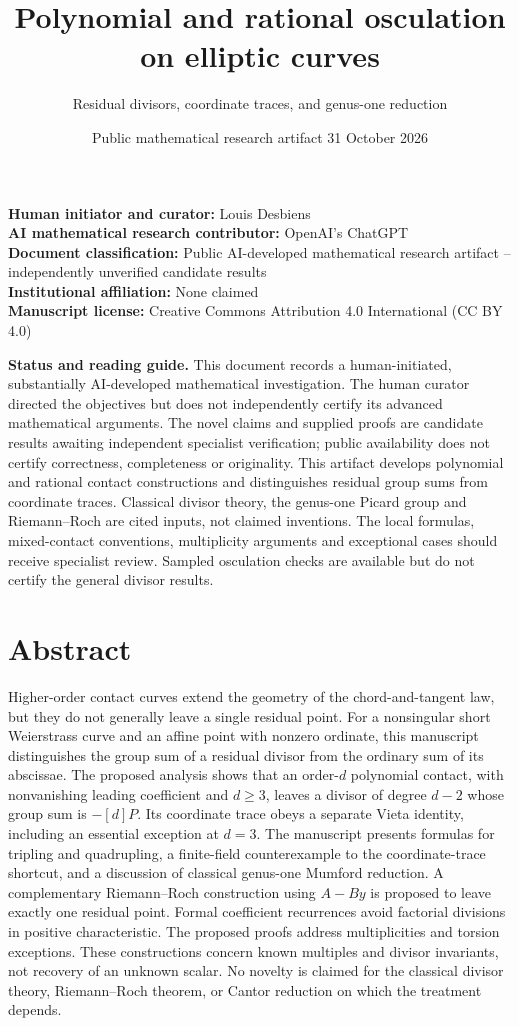 \documentclass[
  11pt,
  a4paper,
]{article}
\title{Polynomial and rational osculation on elliptic curves}
\subtitle{Residual divisors, coordinate traces, and genus-one reduction}
\author{}
\date{Public mathematical research artifact \textbar{} 31 October 2026}
\begin{document}
\maketitle

\textbf{Human initiator and curator:} Louis Desbiens\\
\textbf{AI mathematical research contributor:} OpenAI's ChatGPT\\
\textbf{Document classification:} Public AI-developed mathematical
research artifact -- independently unverified candidate results\\
\textbf{Institutional affiliation:} None claimed\\
\textbf{Manuscript license:} Creative Commons Attribution 4.0 International (CC BY 4.0)

\textbf{Status and reading guide.} This document records a
human-initiated, substantially AI-developed mathematical investigation.
The human curator directed the objectives but does not independently
certify its advanced mathematical arguments. The novel claims and
supplied proofs are candidate results awaiting independent specialist
verification; public availability does not certify correctness,
completeness or originality. This artifact develops polynomial and
rational contact constructions and distinguishes residual group sums
from coordinate traces. Classical divisor theory, the genus-one Picard
group and Riemann--Roch are cited inputs, not claimed inventions. The
local formulas, mixed-contact conventions, multiplicity arguments and
exceptional cases should receive specialist review. Sampled osculation
checks are available but do not certify the general divisor results.

\section{Abstract}\label{abstract}

Higher-order contact curves extend the geometry of the chord-and-tangent
law, but they do not generally leave a single residual point. For a
nonsingular short Weierstrass curve and an affine point with nonzero
ordinate, this manuscript distinguishes the group sum of a residual
divisor from the ordinary sum of its abscissae. The proposed analysis
shows that an order-\(d\) polynomial contact, with nonvanishing leading
coefficient and \(d\geq3\), leaves a divisor of degree \(d-2\) whose
group sum is \(-[d]P\). Its coordinate trace obeys a separate Vieta
identity, including an essential exception at \(d=3\). The manuscript
presents formulas for tripling and quadrupling, a finite-field
counterexample to the coordinate-trace shortcut, and a discussion of
classical genus-one Mumford reduction. A complementary Riemann--Roch
construction using \(A-By\) is proposed to leave exactly one residual
point. Formal coefficient recurrences avoid factorial divisions in
positive characteristic. The proposed proofs address multiplicities and
torsion exceptions. These constructions concern known multiples and
divisor invariants, not recovery of an unknown scalar. No novelty is
claimed for the classical divisor theory, Riemann--Roch theorem, or
Cantor reduction on which the treatment depends.
\end{document}
